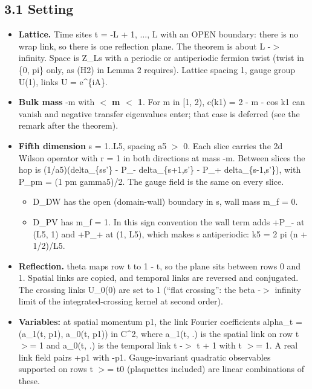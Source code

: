 \documentclass[11pt,a4paper]{article}
\begin{document}
\subsection*{3.1 Setting}
\begin{itemize}
\item{} {\bfseries\boldmath Lattice.} Time sites t = -L + 1, ..., L with an OPEN boundary: there is no wrap link, so there is one reflection
plane. The theorem is about L -$>$ infinity. Space is Z\_Ls with a periodic or antiperiodic fermion twist (twist in
\{0, pi\} only, as (H2) in Lemma 2 requires). Lattice spacing 1, gauge group U(1), links U = e\textasciicircum{}\{iA\}.
\item{} {\bfseries\boldmath Bulk mass} -m with {\bfseries{} $<$ m $<$ 1}. For m in [1, 2), c(k1) = 2 - m - cos k1 can vanish and negative transfer
eigenvalues enter; that case is deferred (see the remark after the theorem).
\item{} {\bfseries\boldmath Fifth dimension} s = 1..L5, spacing a5 $>$ 0. Each slice carries the 2d Wilson operator with r = 1 in both
directions at mass -m. Between slices the hop is (1/a5)(delta\_\{ss'\} - P\_- delta\_\{s+1,s'\} - P\_+ delta\_\{s-1,s'\}),
with P\_pm = (1 pm gamma5)/2. The gauge field is the same on every slice.
\begin{itemize}
\item{} D\_DW has the open (domain-wall) boundary in s, wall mass m\_f = 0.
\item{} D\_PV has m\_f = 1. In this sign convention the wall term adds +P\_- at (L5, 1) and +P\_+ at (1, L5), which makes s
antiperiodic: k5 = 2 pi (n + 1/2)/L5.
\end{itemize}

\item{} {\bfseries\boldmath Reflection.} theta maps row t to 1 - t, so the plane sits between rows 0 and 1. Spatial links are copied, and
temporal links are reversed and conjugated. The crossing links U\_0(0) are set to 1 (``flat crossing'': the
beta -$>$ infinity limit of the integrated-crossing kernel at second order).
\item{} {\bfseries\boldmath Variables:} at spatial momentum p1, the link Fourier coefficients
alpha\_t = (a\_1(t, p1), a\_0(t, p1)) in C\textasciicircum{}2, where a\_1(t, .) is the spatial link on row t $>$= 1 and a\_0(t, .) is the
temporal link t -$>$ t + 1 with t $>$= 1. A real link field pairs +p1 with -p1. Gauge-invariant quadratic observables
supported on rows t $>$= t0 (plaquettes included) are linear combinations of these.
\end{itemize}
\end{document}
